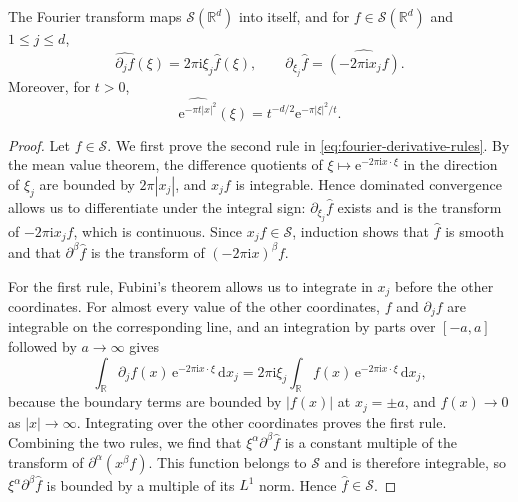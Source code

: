 \begin{lemma}\label{lem:fourier-gaussian}
The Fourier transform maps $\mathcal S(\mathbb R^d)$ into itself, and for $f\in\mathcal S(\mathbb R^d)$ and $1\leq j\leq d$,
\begin{equation}\label{eq:fourier-derivative-rules}
 \widehat{\partial_jf}(\xi)=2\pi\mathrm i\xi_j\widehat f(\xi),\qquad \partial_{\xi_j}\widehat f=\widehat{(-2\pi\mathrm i x_jf)}.
\end{equation}
Moreover, for $t>0$,
\[
 \widehat{\mathrm e^{-\pi t|x|^2}}(\xi)=t^{-d/2}\mathrm e^{-\pi|\xi|^2/t}.
\]
\end{lemma}
\begin{proof}
Let $f\in\mathcal S$. We first prove the second rule in \eqref{eq:fourier-derivative-rules}. By the mean value theorem, the difference quotients of $\xi\mapsto\mathrm e^{-2\pi\mathrm i x\cdot\xi}$ in the direction of $\xi_j$ are bounded by $2\pi|x_j|$, and $x_jf$ is integrable. Hence dominated convergence allows us to differentiate under the integral sign: $\partial_{\xi_j}\widehat f$ exists and is the transform of $-2\pi\mathrm i x_jf$, which is continuous. Since $x_jf\in\mathcal S$, induction shows that $\widehat f$ is smooth and that $\partial^\beta\widehat f$ is the transform of $(-2\pi\mathrm i x)^\beta f$.

For the first rule, Fubini's theorem allows us to integrate in $x_j$ before the other coordinates. For almost every value of the other coordinates, $f$ and $\partial_jf$ are integrable on the corresponding line, and an integration by parts over $[-a,a]$ followed by $a\to\infty$ gives
\[
 \int_{\mathbb R}\partial_jf(x)\,\mathrm e^{-2\pi\mathrm i x\cdot\xi}\,\mathrm d x_j=2\pi\mathrm i\xi_j\int_{\mathbb R}f(x)\,\mathrm e^{-2\pi\mathrm i x\cdot\xi}\,\mathrm d x_j,
\]
because the boundary terms are bounded by $|f(x)|$ at $x_j=\pm a$, and $f(x)\to0$ as $|x|\to\infty$. Integrating over the other coordinates proves the first rule. Combining the two rules, we find that $\xi^\alpha\partial^\beta\widehat f$ is a constant multiple of the transform of $\partial^\alpha(x^\beta f)$. This function belongs to $\mathcal S$ and is therefore integrable, so $\xi^\alpha\partial^\beta\widehat f$ is bounded by a multiple of its $L^1$ norm. Hence $\widehat f\in\mathcal S$.


\end{proof}
